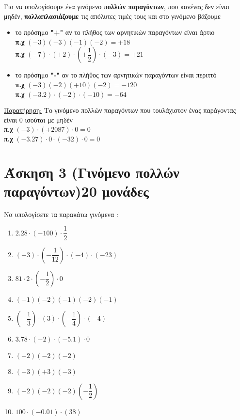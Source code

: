 \documentclass[a4paper,10pt]{report}
\begin{document}
 Για να υπολογίσουμε ένα γινόμενο \textbf{πολλών παραγόντων}, που κανένας δεν είναι μηδέν, \textbf{πολλαπλασιάζουμε} 
       τις απόλυτες τιμές τους και στο γινόμενο βάζουμε 
\begin{itemize}
 \item το πρόσημο \textbf{"+"} αν το πλήθος των αρνητικών παραγόντων είναι άρτιο\\
       \textbf{π.χ} $(-3)(-3)(-1)(-2)=+18$\\
       \textbf{π.χ} $(-7)\cdot(+2)\cdot(+\dfrac{1}{2})\cdot(-3)=+21$      
 \item το πρόσημο \textbf{"-"} αν το πλήθος των αρνητικών παραγόντων είναι περιττό\\
       \textbf{π.χ} $(-3)(-2)(+10)(-2)=-120$\\
       \textbf{π.χ} $(-3.2)\cdot(-2)\cdot(-10)=-64$  
\end{itemize}
\underline{Παρατήρηση:} Το γινόμενο πολλών παραγόντων που τουλάχιστον ένας παράγοντας είναι $0$ ισούται με μηδέν\\
       \textbf{π.χ} $(-3)\cdot(+2087)\cdot0=0$\\
       \textbf{π.χ} $(-3.27)\cdot0\cdot(-32)\cdot0=0$ 

\newpage
\section*{Άσκηση 3  (Γινόμενο πολλών παραγόντων)\hfill \small{20 μονάδες}}
Να υπολογίσετε τα παρακάτω γινόμενα :
\begin{multicols}{2}
\begin{enumerate}[1)]
 \item $2.28\cdot(-100)\cdot \dfrac{1}{2}$
 \item $(-3)\cdot(-\dfrac{1}{12})\cdot(-4)\cdot(-23)$
 \item $81\cdot2\cdot(-\dfrac{1}{2})\cdot0$
 \item $(-1)(-2)(-1)(-2)(-1)$
 \item $(-\dfrac{1}{3})\cdot(3)\cdot(-\dfrac{1}{4})\cdot(-4)$
 \item $3.78\cdot(-2)\cdot(-5.1)\cdot0$
 \item $(-2)(-2)(-2)$
 \item $(-3)(+3)(-3)$
 \item $(+2)(-2)(-2)(-\dfrac{1}{2})$
 \item $100\cdot(-0.01)\cdot(38)$
\end{enumerate}
\end{multicols}
\end{document}
